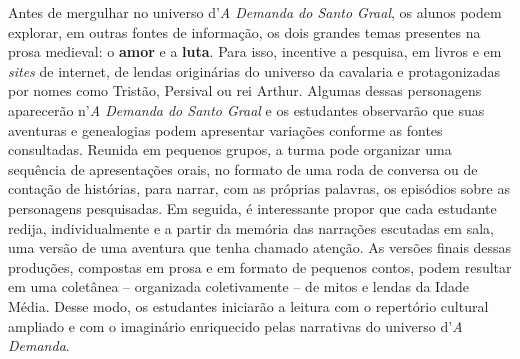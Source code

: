 \documentclass[11pt]{extarticle}
\begin{document}
Antes de mergulhar no universo d'\emph{A Demanda do Santo
Graal}, os alunos podem explorar, em outras fontes de informação, os
dois grandes temas presentes na prosa medieval: o \textbf{amor} e a
\textbf{luta}. Para isso, incentive a pesquisa, em livros e em
\emph{sites} de internet, de lendas originárias do universo da cavalaria
e protagonizadas por nomes como Tristão, Persival ou rei Arthur. Algumas
dessas personagens aparecerão n'\emph{A Demanda do Santo Graal} e os
estudantes observarão que suas aventuras e genealogias podem apresentar
variações conforme as fontes consultadas. Reunida em pequenos grupos, a
turma pode organizar uma sequência de apresentações orais, no formato de
uma roda de conversa ou de contação de histórias, para narrar, com as
próprias palavras, os episódios sobre as personagens pesquisadas. Em
seguida, é interessante propor que cada estudante redija,
individualmente e a partir da memória das narrações escutadas em sala,
uma versão de uma aventura que tenha chamado atenção. As versões finais
dessas produções, compostas em prosa e em formato de pequenos contos,
podem resultar em uma coletânea -- organizada coletivamente -- de mitos
e lendas da Idade Média. Desse modo, os estudantes iniciarão a leitura
com o repertório cultural ampliado e com o imaginário enriquecido pelas
narrativas do universo d'\emph{A Demanda}.
\end{document}

